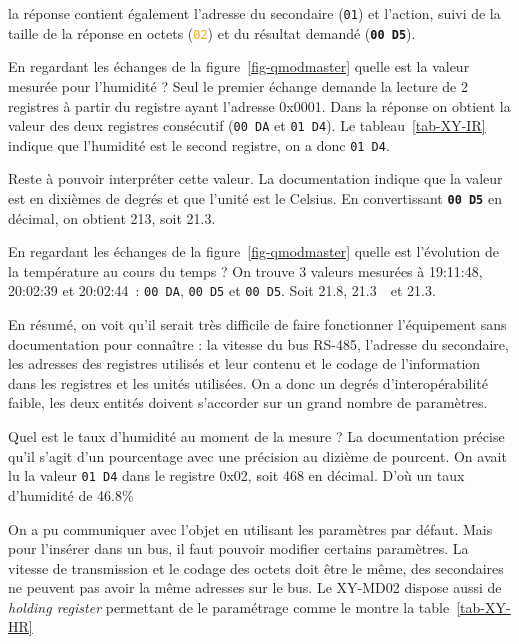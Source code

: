 la réponse contient également l'adresse du secondaire (\texttt{01}) et l'action, suivi de la taille de la réponse en octets (\texttt{\textcolor{orange}{02}}) et du résultat demandé (\texttt{\textbf{00 D5}}). 

{En regardant les échanges de la figure~\vref{fig-qmodmaster} quelle est la valeur mesurée pour l'humidité ?}
{Seul le premier échange demande la lecture de 2 registres à partir du registre ayant l'adresse 0x0001. Dans la réponse on obtient la valeur des deux registres consécutif (\texttt{00 DA} et \texttt{01 D4}). Le tableau~\vref{tab-XY-IR} indique que l'humidité est le second registre, on a donc \texttt{01 D4}.}

Reste à pouvoir interpréter cette valeur. La documentation indique que la valeur est en dixièmes de degrés et que l'unité est le Celsius. En convertissant \texttt{\textbf{00 D5}} en décimal, on obtient 213, soit 21.3\textcelsius.

{En regardant les échanges de la figure~\vref{fig-qmodmaster} quelle est l'évolution de la température au cours du temps ?}
{On trouve 3 valeurs mesurées à 19:11:48, 20:02:39 et 20:02:44~: \texttt{00 DA}, \texttt{00 D5} et \texttt{00 D5}. Soit 21.8\textcelsius, 21.3\textcelsius ~~et 21.3\textcelsius.}

En résumé, on voit qu'il serait très difficile de faire fonctionner l'équipement sans documentation pour connaître : la vitesse du bus RS-485, l'adresse du secondaire, les adresses des registres utilisés et leur contenu et le codage de l'information dans les registres et les unités utilisées. On a donc un degrés d'interopérabilité faible, les deux entités doivent s'accorder sur un grand nombre de paramètres.

{Quel est le taux d'humidité au moment de la mesure ? La documentation précise qu'il s'agit d'un pourcentage avec une précision au dizième de pourcent. }
{On avait lu la valeur \texttt{01 D4} dans le registre 0x02, soit 468 en décimal. D'où un taux d'humidité de 46.8\%}
    \vspace{1em}

On a pu communiquer avec l'objet en utilisant les paramètres par défaut. Mais pour l'insérer dans un bus, il faut pouvoir modifier certains paramètres. La vitesse de transmission et le codage des octets doit être le même, des secondaires ne peuvent pas avoir la même adresses sur le bus.
Le XY-MD02 dispose aussi de \textit{holding register} permettant de le paramétrage comme le montre la table~\vref{tab-XY-HR}


